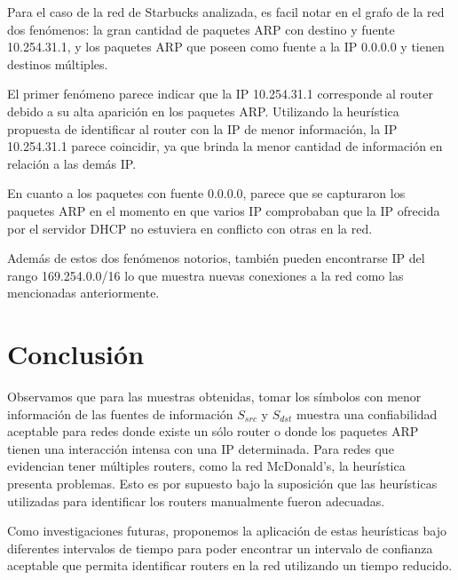 \documentclass[a4paper, 10pt, twoside]{article}
\begin{document}
Para el caso de la red de Starbucks analizada, es facil notar en el grafo de la red dos fenómenos: la gran cantidad de paquetes ARP con destino y fuente 10.254.31.1, y los paquetes ARP que poseen como fuente a la IP 0.0.0.0 y tienen destinos múltiples.

El primer fenómeno parece indicar que la IP 10.254.31.1 corresponde al router debido a su alta aparición en los paquetes ARP. Utilizando la heurística propuesta de identificar al router con la IP de menor información, la IP 10.254.31.1 parece coincidir, ya que brinda la menor cantidad de información en relación a las demás IP.

En cuanto a los paquetes con fuente 0.0.0.0, parece que se capturaron los paquetes ARP en el momento en que varios IP comprobaban que la IP ofrecida por el servidor DHCP no estuviera en conflicto con otras en la red.

Además de estos dos fenómenos notorios, también pueden encontrarse IP del rango 169.254.0.0/16 lo que muestra nuevas conexiones a la red como las mencionadas anteriormente.




\section{Conclusión}

Observamos que para las muestras obtenidas, tomar los símbolos con menor información de las fuentes de información $S_{src}$ y $S_{dst}$ muestra una confiabilidad aceptable para redes donde existe un sólo router o donde los paquetes ARP tienen una interacción intensa con una IP determinada. Para redes que evidencian tener múltiples routers, como la red McDonald's, la heurística presenta problemas. Esto es por supuesto bajo la suposición que las heurísticas utilizadas para identificar los routers manualmente fueron adecuadas.

Como investigaciones futuras, proponemos la aplicación de estas heurísticas bajo diferentes intervalos de tiempo para poder encontrar un intervalo de confianza aceptable que permita identificar routers en la red utilizando un tiempo reducido.

\end{document}

